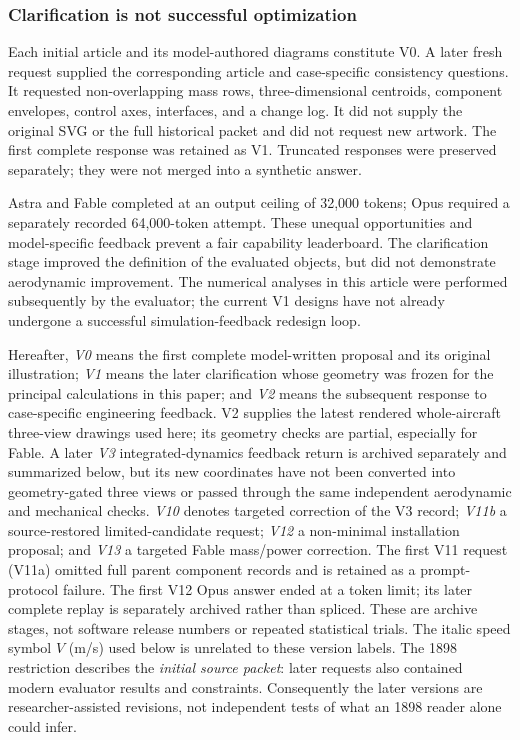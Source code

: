 \documentclass[10pt,letterpaper]{article}
\begin{document}
\subsubsection{Clarification is not successful optimization}
Each initial article and its model-authored diagrams constitute V0. A later fresh request supplied the corresponding article and case-specific consistency questions. It requested non-overlapping mass rows, three-dimensional centroids, component envelopes, control axes, interfaces, and a change log. It did not supply the original SVG or the full historical packet and did not request new artwork. The first complete response was retained as V1. Truncated responses were preserved separately; they were not merged into a synthetic answer.

Astra and Fable completed at an output ceiling of 32,000 tokens; Opus required a separately recorded 64,000-token attempt. These unequal opportunities and model-specific feedback prevent a fair capability leaderboard. The clarification stage improved the definition of the evaluated objects, but did not demonstrate aerodynamic improvement. The numerical analyses in this article were performed subsequently by the evaluator; the current V1 designs have not already undergone a successful simulation-feedback redesign loop.

Hereafter, \emph{V0} means the first complete model-written proposal and its original illustration; \emph{V1} means the later clarification whose geometry was frozen for the principal calculations in this paper; and \emph{V2} means the subsequent response to case-specific engineering feedback. V2 supplies the latest rendered whole-aircraft three-view drawings used here; its geometry checks are partial, especially for Fable. A later \emph{V3} integrated-dynamics feedback return is archived separately and summarized below, but its new coordinates have not been converted into geometry-gated three views or passed through the same independent aerodynamic and mechanical checks. \emph{V10} denotes targeted correction of the V3 record; \emph{V11b} a source-restored limited-candidate request; \emph{V12} a non-minimal installation proposal; and \emph{V13} a targeted Fable mass/power correction. The first V11 request (V11a) omitted full parent component records and is retained as a prompt-protocol failure. The first V12 Opus answer ended at a token limit; its later complete replay is separately archived rather than spliced. These are archive stages, not software release numbers or repeated statistical trials. The italic speed symbol $V$ (m/s) used below is unrelated to these version labels. The 1898 restriction describes the \emph{initial source packet}: later requests also contained modern evaluator results and constraints. Consequently the later versions are researcher-assisted revisions, not independent tests of what an 1898 reader alone could infer.
\end{document}
